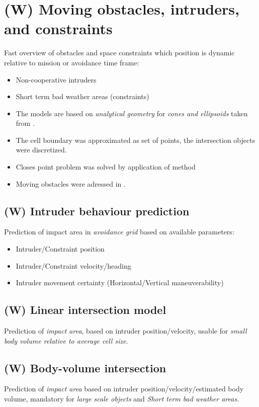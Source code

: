 \section{(W) Moving obstacles, intruders, and constraints}\label{s:intruders}
    \noindent Fast overview of obstacles and space constraints which position is dynamic relative to mission or avoidance time frame:
    \begin{itemize}
        \item Non-cooperative intruders
        \item Short term bad weather areas (constraints)
        \item The models are based on \emph{analytical geometry} for \emph{cones and ellipsoids} taken from \cite{sommerville2016analytical}.
        \item The cell boundary was approximated as set of points, the intersection objects were discretized.
        \item Closes point problem \cite{shamos1975closest} was solved by application of method  \cite{bentley1980optimal}
		\item Moving obstacles were adressed in \cite{fiorini1998motion}.
    \end{itemize}
    
\subsection{(W) Intruder behaviour prediction}\label{s:intruderBehaviourPrediction}
    \noindent Prediction of impact area in \emph{avoidance grid} based on available parameters:
    \begin{itemize}
        \item Intruder/Constraint position
        \item Intruder/Constraint velocity/heading
        \item Intruder movement certainty (Horizontal/Vertical maneuverability)
    \end{itemize}
    
\subsection{(W) Linear intersection model}\label{s:linearIntersectionModel}
    \noindent Prediction of \emph{impact area}, based on intruder position/velocity, usable for \emph{small body volume relative to average cell size}.
    
\subsection{(W) Body-volume intersection}\label{s:bodyvolumeIntersection}
    \noindent Prediction of \emph{impact area} based on intruder position/velocity/estimated body volume, mandatory for \emph{large scale objects} and \emph{Short term bad weather areas}.
    
